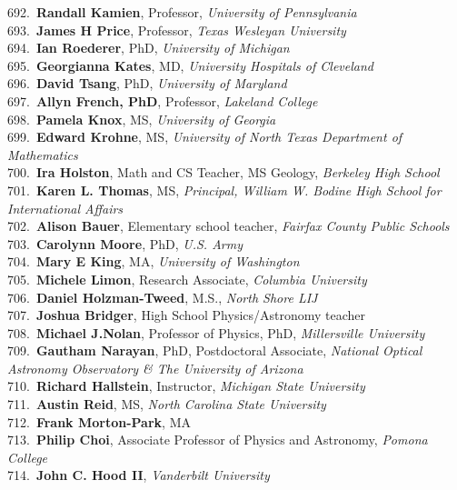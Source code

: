 692.~{\bf Randall Kamien}, Professor, {\sl University of Pennsylvania } \\
693.~{\bf James H Price}, Professor, {\sl Texas Wesleyan University} \\
694.~{\bf Ian Roederer}, PhD, {\sl University of Michigan} \\
695.~{\bf Georgianna Kates}, MD, {\sl University Hospitals of Cleveland} \\
696.~{\bf David Tsang}, PhD, {\sl University of Maryland} \\
697.~{\bf Allyn French, PhD}, Professor, {\sl Lakeland College} \\
698.~{\bf Pamela Knox}, MS, {\sl University of Georgia} \\
699.~{\bf Edward Krohne}, MS, {\sl University of North Texas Department of Mathematics} \\
700.~{\bf Ira Holston}, Math and CS Teacher, MS Geology, {\sl Berkeley High School} \\
701.~{\bf Karen L. Thomas}, MS, {\sl Principal, William W. Bodine High School for International Affairs} \\
702.~{\bf Alison Bauer}, Elementary school teacher, {\sl Fairfax County Public Schools} \\
703.~{\bf Carolynn Moore}, PhD, {\sl U.S. Army} \\
704.~{\bf Mary E King}, MA, {\sl University of Washington} \\
705.~{\bf Michele Limon}, Research Associate, {\sl Columbia University} \\
706.~{\bf Daniel Holzman-Tweed}, M.S., {\sl North Shore LIJ} \\
707.~{\bf Joshua Bridger}, High School Physics/Astronomy teacher \\
708.~{\bf Michael J.Nolan}, Professor of Physics, PhD, {\sl Millersville University} \\
709.~{\bf Gautham Narayan}, PhD, Postdoctoral Associate, {\sl National Optical Astronomy Observatory \& The University of Arizona} \\
710.~{\bf Richard Hallstein}, Instructor, {\sl Michigan State University} \\
711.~{\bf Austin Reid}, MS, {\sl North Carolina State University} \\
712.~{\bf Frank Morton-Park}, MA \\
713.~{\bf Philip Choi}, Associate Professor of Physics and Astronomy, {\sl Pomona College} \\
714.~{\bf John C. Hood II}, {\sl Vanderbilt University} \\

